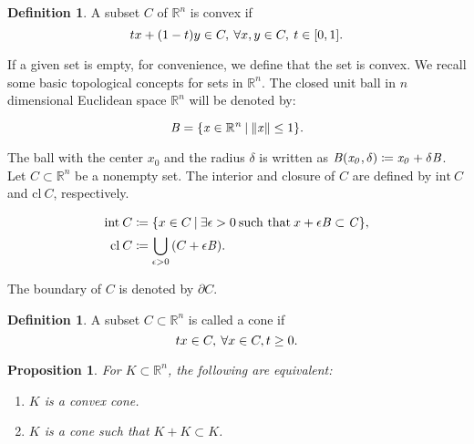 \documentclass[a4paper,11pt, oneside]{book}
\newtheorem{prop}[thm]{Proposition}
\theoremstyle{definition}
\newtheorem{dfn}[thm]{Definition}
\newcommand{\NDemenstionalRealEuclideanSpace}{\mathbb{R}^n}
\newcommand{\Closure}[1]{\text{\rm cl\:${#1}$}} %
\newcommand{\Interior}[1]{\text{\rm int\:${#1}$}} %
\newcommand{\SetForm}[2]{
  \{{#1}\:|\:{#2}\}
}
\begin{document}
\begin{dfn}
  A subset $C$ of $\NDemenstionalRealEuclideanSpace$ is convex if
  \begin{equation}
    tx + (1-t)y \in C,\:\forall x,y \in C,\:t \in [0,1].\notag
  \end{equation}
\end{dfn}
If a given set is empty, for convenience, we define that the set is convex. We recall some basic topological concepts for sets in $\NDemenstionalRealEuclideanSpace$. The closed unit ball in $n$ dimensional Euclidean space $\NDemenstionalRealEuclideanSpace$ will be denoted by:

\begin{equation}
  \it{B} = \SetForm{x \in \NDemenstionalRealEuclideanSpace}{\left\lVert x \right\rVert \leq \text{1}}. \notag
\end{equation}

The ball with the center $x_0$ and the radius $\delta$ is written as $\it{B}(x_0, \delta) \coloneqq x_0 + \delta \it{B}$. Let $C \subset \NDemenstionalRealEuclideanSpace$ be a nonempty set. The interior and closure of $C$ are defined by $\text{int}\:C$ and $\text{cl}\:C$, respectively.

\begin{equation}
  \begin{split}
    \Interior{C} &\coloneqq \SetForm{x \in C}{\exists \epsilon > 0 \:\text{such that}\: x +\epsilon\it{B} \subset C}, \\
    \Closure{C} &\coloneqq \bigcup_{\epsilon > 0}{(C + \epsilon\it{B})}. \notag \\
    \end{split}
\end{equation}

The boundary of $C$ is denoted by $\partial C$.

\begin{dfn}
  A subset $C \subset \NDemenstionalRealEuclideanSpace$ is called a cone if
  \begin{equation}
    tx \in C,\:\forall x \in C, t\geq0. \notag
  \end{equation}
\end{dfn}

\begin{prop}
  For $K \subset \NDemenstionalRealEuclideanSpace$, the following are equivalent:
  \begin{enumerate}[label=\roman*,align=CenterWithParen]
    \item $K$ is a convex cone.
    \item $K$ is a cone such that $K + K \subset K$.
  \end{enumerate}
\end{prop}
\end{document}
